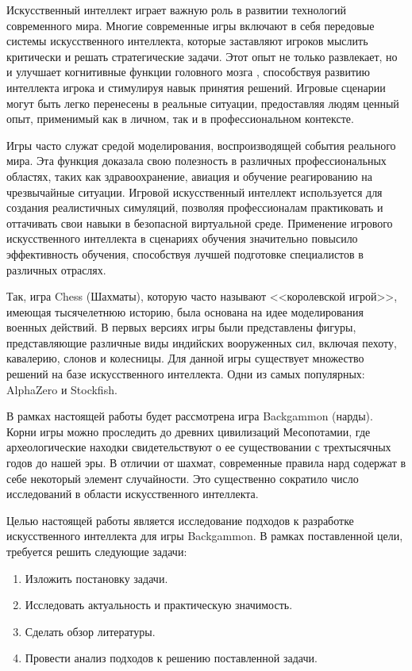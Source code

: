 Искусственный интеллект играет важную роль в развитии технологий современного мира. Многие современные игры включают в себя передовые системы искусственного интеллекта, которые заставляют игроков мыслить критически и решать стратегические задачи. Этот опыт не только развлекает, но и улучшает когнитивные функции головного мозга \cite{cognfunc}, способствуя развитию интеллекта игрока и стимулируя навык принятия решений. Игровые сценарии могут быть легко перенесены в реальные ситуации, предоставляя людям ценный опыт, применимый как в личном, так и в профессиональном контексте.

Игры часто служат средой моделирования, воспроизводящей события реального мира. Эта функция доказала свою полезность в различных профессиональных областях, таких как здравоохранение, авиация и обучение реагированию на чрезвычайные ситуации. Игровой искусственный интеллект используется для создания реалистичных симуляций, позволяя профессионалам практиковать и оттачивать свои навыки в безопасной виртуальной среде. Применение игрового искусственного интеллекта в сценариях обучения значительно повысило эффективность обучения, способствуя лучшей подготовке специалистов в различных отраслях.

Так, игра Chess (Шахматы), которую часто называют <<королевской игрой>>, имеющая тысячелетнюю историю, была основана на идее моделирования военных действий. В первых версиях игры были представлены фигуры, представляющие различные виды индийских вооруженных сил, включая пехоту, кавалерию, слонов и колесницы. Для данной игры существует множество решений на базе искусственного интеллекта. Одни из самых популярных: AlphaZero и Stockfish.

В рамках настоящей работы будет рассмотрена игра Backgammon (нарды). Корни игры можно проследить до древних цивилизаций Месопотамии, где археологические находки свидетельствуют о ее существовании с трехтысячных годов до нашей эры. В отличии от шахмат, современные правила нард содержат в себе некоторый элемент случайности. Это существенно сократило число исследований в области искусственного интеллекта.

Целью настоящей работы является исследование подходов к разработке искусственного интеллекта для игры Backgammon. В рамках поставленной цели, требуется решить следующие задачи:
\begin{enumerate}
\item Изложить постановку задачи.
\item Исследовать актуальность и практическую значимость.
\item Сделать обзор литературы.
\item Провести анализ подходов к решению поставленной задачи.
\end{enumerate}
